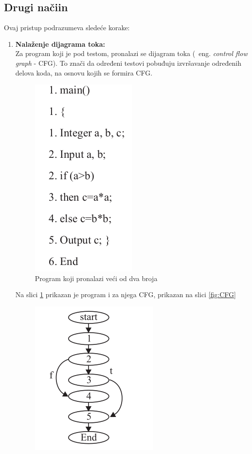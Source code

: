 \documentclass[a4paper]{article}
\theoremstyle{definition}
\begin{document}
\subsection{Drugi načiin}
\label{subsec:drugi}

Ovaj pristup\cite{druginacin} podrazumeva sledeće korake:
\begin{enumerate}
    \item \textbf{Nalaženje dijagrama toka:}\\
    Za program koji je pod testom, pronalazi se dijagram toka (~eng. \emph{control flow graph} - CFG). To znači da određeni testovi pobuđuju izvršavanje određenih delova koda, na osnovu kojih se formira CFG.
        \begin{figure}[h!]
        \begin{center}
        \includegraphics[scale=0.25]{program.png}
        \end{center}
        \caption{Program koji pronalazi veći od dva broja}
        \label{fig:program}
        \end{figure}
        Na slici \ref{fig:program} prikazan je program i za njega CFG, prikazan na slici \ref{fig:CFG}
        \begin{figure}[h!]
        \begin{center}
        \includegraphics[scale=0.25]{CFG.png}

\end{center}
\end{figure}
\end{enumerate}
\end{document}
